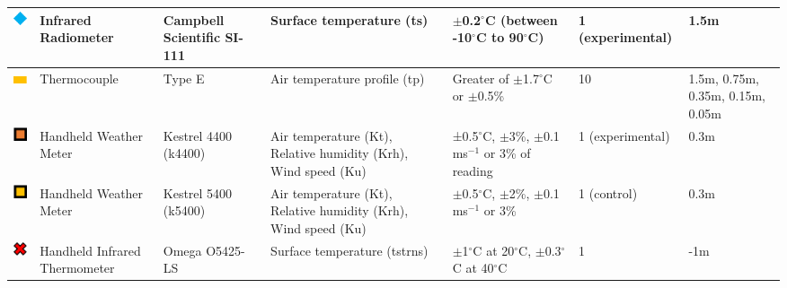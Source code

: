 \documentclass[final,3p,times,authoryear]{elsarticle}
\begin{document}
\begin{table}[!ht]
\begin{tabular}{|p{0.90cm}|p{2.0cm}|p{2.0cm}|p{3.5cm}|p{2.5cm}|p{1.0cm}|p{1.0cm}|}
\includegraphics[trim={0 0 0 0},clip,scale=0.5]{Picture5.png}&Infrared Radiometer&Campbell Scientific SI-111&Surface temperature (\gls{ts})&$\pm$0.2$^{\circ}$C (between -10$^{\circ}$C to 90$^{\circ}$C)&1 (experimental)&1.5m \\ \hline   

\includegraphics[trim={0 0 0 0},clip,scale=0.5]{Picture6.png}&Thermocouple&Type E&Air temperature profile (\gls{tp})&Greater of $\pm$1.7$^{\circ}$C or $\pm$0.5\%&10&1.5m, 0.75m, 0.35m, 0.15m, 0.05m \\ \hline     

\includegraphics[trim={0 0 0 0},clip,scale=0.5]{Picture7.png}&Handheld Weather Meter&Kestrel 4400 (k4400)&Air temperature (\gls{Kt}), Relative humidity (\gls{Krh}), Wind speed (\gls{Ku})&±0.5$^{\circ}$C, $\pm$3\%, $\pm$0.1 ms$^{-1}$ or 3\% of reading&1 (experimental)&0.3m \\ \hline

\includegraphics[trim={0 0 0 0},clip,scale=0.5]{Picture8.png}&Handheld Weather Meter&Kestrel 5400 (k5400)&Air temperature (\gls{Kt}), Relative humidity (\gls{Krh}), Wind speed (\gls{Ku})&$\pm$0.5$^{\circ}$C, $\pm$2\%, $\pm$0.1 ms$^{-1}$ or 3\%&1 (control)&0.3m \\ \hline 

\includegraphics[trim={0 0 0 0},clip,scale=0.5]{Picture9.png}&Handheld Infrared Thermometer&Omega O5425-LS&Surface temperature (\gls{tstrns})&$\pm$1$^{\circ}$C at 20$^{\circ}$C, $\pm$0.3$^{\circ}$C at 40$^{\circ}$C&1&-1m \\ \hline    
  
          

\end{tabular}
\end{table}
\end{document}
